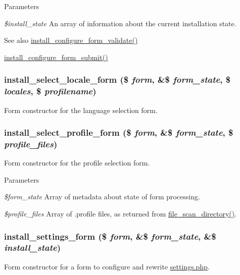 \begin{DoxyParams}{Parameters}
\item[{\em \$install\_\-state}]An array of information about the current installation state.\end{DoxyParams}
\begin{DoxySeeAlso}{See also}
\hyperlink{install_8core_8inc_a6b3794048999c91eed0b6a7633a8e8f3}{install\_\-configure\_\-form\_\-validate()} 

\hyperlink{install_8core_8inc_ac4774b453669916d9ffbb619b4bf9717}{install\_\-configure\_\-form\_\-submit()} 
\end{DoxySeeAlso}
\hypertarget{group__forms_ga7c540506932fb00783972b742787ddeb}{
\subsubsection[{install\_\-select\_\-locale\_\-form}]{\setlength{\rightskip}{0pt plus 5cm}install\_\-select\_\-locale\_\-form (\$ {\em form}, \/  \&\$ {\em form\_\-state}, \/  \$ {\em locales}, \/  \$ {\em profilename})}}
\label{group__forms_ga7c540506932fb00783972b742787ddeb}
Form constructor for the language selection form. \hypertarget{group__forms_ga1ead61881194a861349f2c1c1e508752}{
\subsubsection[{install\_\-select\_\-profile\_\-form}]{\setlength{\rightskip}{0pt plus 5cm}install\_\-select\_\-profile\_\-form (\$ {\em form}, \/  \&\$ {\em form\_\-state}, \/  \$ {\em profile\_\-files})}}
\label{group__forms_ga1ead61881194a861349f2c1c1e508752}
Form constructor for the profile selection form.


\begin{DoxyParams}{Parameters}
\item[{\em \$form\_\-state}]Array of metadata about state of form processing. \item[{\em \$profile\_\-files}]Array of .profile files, as returned from \hyperlink{group__file_ga363e988787ffa45bff69ff051eed0615}{file\_\-scan\_\-directory()}. \end{DoxyParams}
\hypertarget{group__forms_ga4fe8554aa15e5b0b78a15400c2d37d28}{
\subsubsection[{install\_\-settings\_\-form}]{\setlength{\rightskip}{0pt plus 5cm}install\_\-settings\_\-form (\$ {\em form}, \/  \&\$ {\em form\_\-state}, \/  \&\$ {\em install\_\-state})}}
\label{group__forms_ga4fe8554aa15e5b0b78a15400c2d37d28}
Form constructor for a form to configure and rewrite \hyperlink{settings_8php}{settings.php}.


